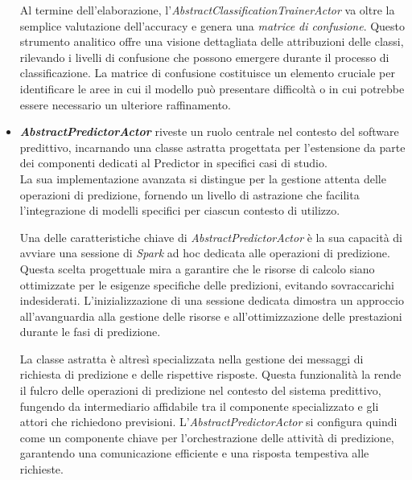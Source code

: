 \begin{itemize}
    Al termine dell'elaborazione, l'\textit{AbstractClassificationTrainerActor} va oltre la semplice valutazione dell'accuracy e genera una \textit{matrice di confusione}.
    Questo strumento analitico offre una visione dettagliata delle attribuzioni delle classi, rilevando i livelli di confusione che possono emergere durante il processo di classificazione.
    La matrice di confusione costituisce un elemento cruciale per identificare le aree in cui il modello può presentare difficoltà o in cui potrebbe essere necessario un ulteriore raffinamento.

    \item \textit{\textbf{AbstractPredictorActor}} riveste un ruolo centrale nel contesto del software predittivo, incarnando una classe astratta progettata per l'estensione da parte dei componenti dedicati al Predictor in specifici casi di studio. \\
    La sua implementazione avanzata si distingue per la gestione attenta delle operazioni di predizione, fornendo un livello di astrazione che facilita l'integrazione di modelli specifici per ciascun contesto di utilizzo.

    Una delle caratteristiche chiave di \textit{AbstractPredictorActor} è la sua capacità di avviare una sessione di \textit{Spark} ad hoc dedicata alle operazioni di predizione.
    Questa scelta progettuale mira a garantire che le risorse di calcolo siano ottimizzate per le esigenze specifiche delle predizioni, evitando sovraccarichi indesiderati.
    L'inizializzazione di una sessione dedicata dimostra un approccio all'avanguardia alla gestione delle risorse e all'ottimizzazione delle prestazioni durante le fasi di predizione. 

    La classe astratta è altresì specializzata nella gestione dei messaggi di richiesta di predizione e delle rispettive risposte.
    Questa funzionalità la rende il fulcro delle operazioni di predizione nel contesto del sistema predittivo, fungendo da intermediario affidabile tra il componente specializzato e gli attori che richiedono previsioni.
    L'\textit{AbstractPredictorActor} si configura quindi come un componente chiave per l'orchestrazione delle attività di predizione, garantendo una comunicazione efficiente e una risposta tempestiva alle richieste. 


\end{itemize}
